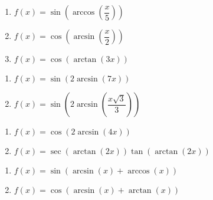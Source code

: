 \documentclass{ximera}
\begin{document}
\begin{multicols}{3}

\begin{enumerate}

\setcounter{enumi}{\value{HW}}

\item  $f(x) = \sin\left(\arccos\left(\dfrac{x}{5}\right)\right)$
\item $f(x) = \cos\left(\arcsin\left(\dfrac{x}{2}\right)\right)$
\item  $f(x) = \cos\left(\arctan\left(3x\right)\right)$ 

\setcounter{HW}{\value{enumi}}

\end{enumerate}

\end{multicols}

\begin{multicols}{2}

\begin{enumerate}

\setcounter{enumi}{\value{HW}}

\item $f(x) = \sin(2\arcsin(7x))$ 
\item  $f(x) = \sin\left(2 \arcsin\left( \dfrac{x\sqrt{3}}{3} \right) \right)$

\setcounter{HW}{\value{enumi}}

\end{enumerate}

\end{multicols}

\begin{multicols}{2}

\begin{enumerate}

\setcounter{enumi}{\value{HW}}

\item $f(x) = \cos(2 \arcsin(4x))$
\item$f(x) = \sec(\arctan(2x))\tan(\arctan(2x))$

\setcounter{HW}{\value{enumi}}

\end{enumerate}

\end{multicols}

\begin{multicols}{2}

\begin{enumerate}

\setcounter{enumi}{\value{HW}}

\item $f(x) = \sin \left( \arcsin(x) + \arccos(x) \right)$ 
\item $f(x) = \cos \left( \arcsin(x) + \arctan(x) \right)$ 

\setcounter{HW}{\value{enumi}}

\end{enumerate}

\end{multicols}
\end{document}

